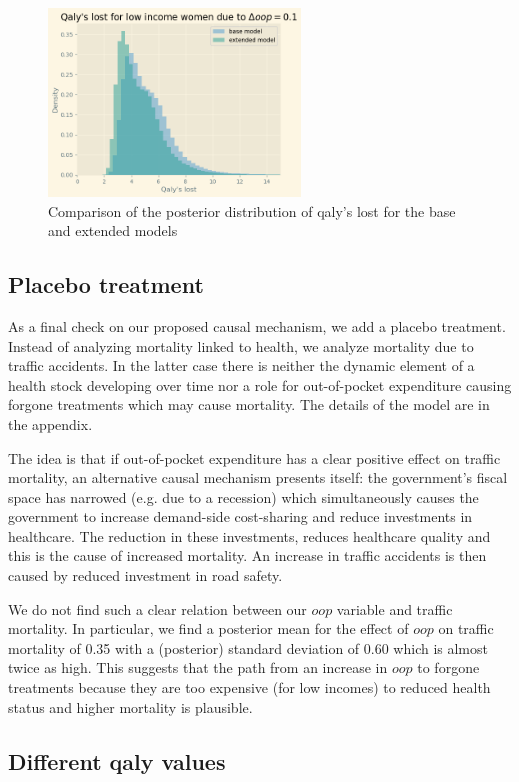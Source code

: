 \documentclass[a4paper,12pt]{article}
\begin{document}
\begin{figure}[htbp]
\centering
\includegraphics[height=5cm]{./figures/lifeyears_comparison_extended.png}
\caption{\label{fig:comparisonBaseExtendedModel}Comparison of the posterior distribution of qaly's lost for the base and extended models}
\end{figure}
\subsection{Placebo treatment}
\label{sec:org5bd6eee}

As a final check on our proposed causal mechanism, we add a placebo treatment. Instead of analyzing mortality linked to health, we analyze mortality due to traffic accidents. In the latter case there is neither the dynamic element of a health stock developing over time nor a role for out-of-pocket expenditure causing forgone treatments which may cause mortality. The details of the model are in the appendix.

The idea is that if out-of-pocket expenditure has a clear positive effect on traffic mortality, an alternative causal mechanism presents itself: the government's fiscal space has narrowed (e.g. due to a recession) which simultaneously causes the government to increase demand-side cost-sharing and reduce investments in healthcare. The reduction in these investments, reduces healthcare quality and this is the cause of increased mortality. An increase in traffic accidents is then caused by reduced investment in road safety.

We do not find such a clear relation between our \(oop\) variable and traffic mortality. In particular, we find a posterior mean for the effect of \(oop\) on traffic mortality of 0.35 with a (posterior) standard deviation of 0.60 which is almost twice as high. This suggests that the path from an increase in \(oop\) to forgone treatments because they are too expensive (for low incomes) to reduced health status and higher mortality is plausible.
\subsection{Different qaly values}
\label{sec:org79484dd}
\end{document}
